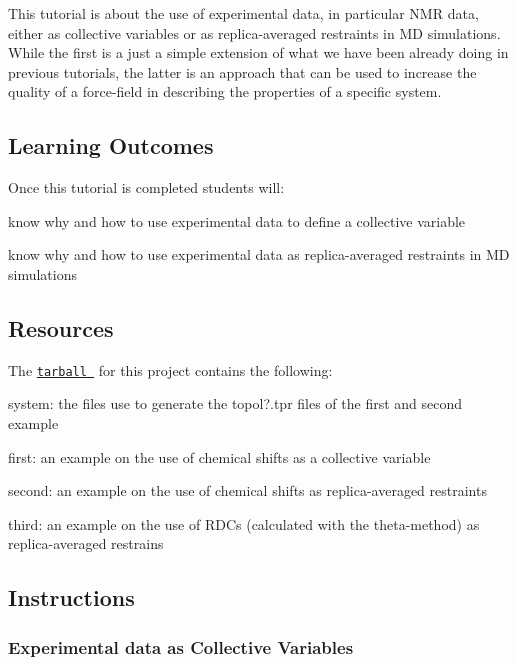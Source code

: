 This tutorial is about the use of experimental data, in particular N\+M\+R data, either as collective variables or as replica-\/averaged restraints in M\+D simulations. While the first is a just a simple extension of what we have been already doing in previous tutorials, the latter is an approach that can be used to increase the quality of a force-\/field in describing the properties of a specific system.\hypertarget{belfast-9_belfast-9-lo}{}\subsection{Learning Outcomes}\label{belfast-9_belfast-9-lo}
Once this tutorial is completed students will\+:
\begin{DoxyItemize}
\item know why and how to use experimental data to define a collective variable
\item know why and how to use experimental data as replica-\/averaged restraints in M\+D simulations
\end{DoxyItemize}\hypertarget{belfast-10_Resources}{}\subsection{Resources}\label{belfast-10_Resources}
The \href{tutorial-resources/belfast-9a.tar.gz}{\tt tarball } for this project contains the following\+:
\begin{DoxyItemize}
\item system\+: the files use to generate the topol?.tpr files of the first and second example
\item first\+: an example on the use of chemical shifts as a collective variable
\item second\+: an example on the use of chemical shifts as replica-\/averaged restraints
\item third\+: an example on the use of R\+D\+Cs (calculated with the theta-\/method) as replica-\/averaged restrains
\end{DoxyItemize}\hypertarget{belfast-10_Instructions}{}\subsection{Instructions}\label{belfast-10_Instructions}
\hypertarget{belfast-9_expdata}{}\subsubsection{Experimental data as Collective Variables}\label{belfast-9_expdata}
